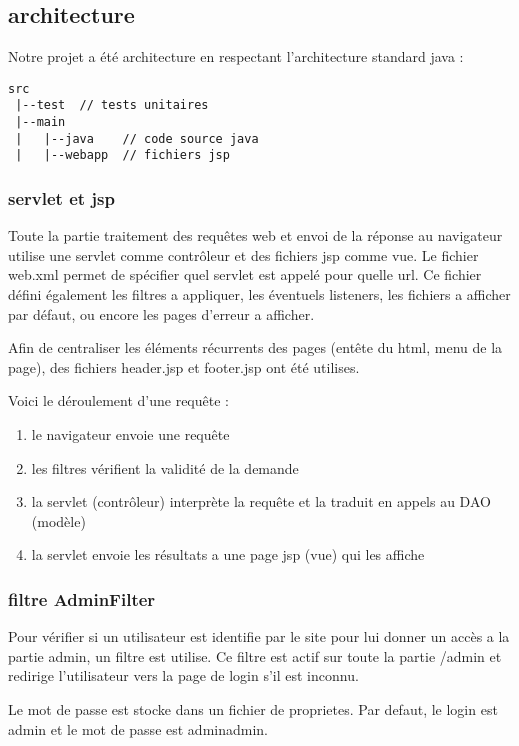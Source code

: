 \subsection{architecture}

Notre projet a été architecture en respectant l'architecture standard java :
\begin{verbatim}
src
 |--test  // tests unitaires
 |--main
 |   |--java    // code source java
 |   |--webapp  // fichiers jsp
\end{verbatim}

\subsubsection{servlet et jsp}
Toute la partie traitement des requêtes web et envoi de la réponse au navigateur utilise une servlet comme contrôleur et des fichiers jsp comme vue. Le fichier web.xml permet de spécifier quel servlet est appelé pour quelle url. Ce fichier défini également les filtres a appliquer, les éventuels listeners, les fichiers a afficher par défaut, ou encore les pages d'erreur a afficher.

Afin de centraliser les éléments récurrents des pages (entête du html, menu de la page), des fichiers header.jsp et footer.jsp ont été utilises.

Voici le déroulement d'une requête : 
\begin{enumerate}
	\item le navigateur envoie une requête
	\item les filtres vérifient la validité de la demande
	\item la servlet (contrôleur) interprète la requête et la traduit en appels au DAO (modèle)
	\item la servlet envoie les résultats a une page jsp (vue) qui les affiche
\end{enumerate}

\subsubsection{filtre AdminFilter}
Pour vérifier si un utilisateur est identifie par le site pour lui donner un accès a la partie admin, un filtre est utilise. Ce filtre est actif sur toute la partie /admin et redirige l'utilisateur vers la page de login s'il est inconnu.

Le mot de passe est stocke dans un fichier de proprietes. Par defaut, le login est admin et le mot de passe est adminadmin.

